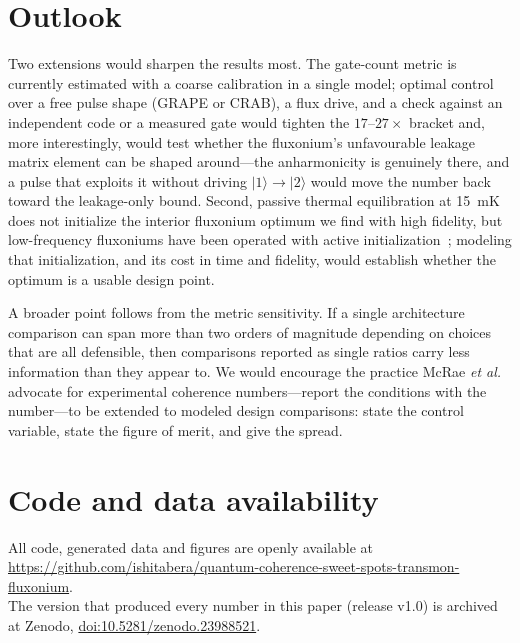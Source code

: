 \documentclass{SciPost}
\begin{document}
\section{Outlook}

Two extensions would sharpen the results most. The gate-count metric is currently estimated with a
coarse calibration in a single model; optimal control over a free pulse shape (GRAPE or CRAB),
a flux drive, and a check against an independent code or a measured gate would tighten the $17$--$27\times$ bracket and, more interestingly, would test whether the fluxonium's
unfavourable leakage matrix element can be shaped around---the anharmonicity is genuinely
there, and a pulse that exploits it without driving $|1\rangle \to |2\rangle$ would move the
number back toward the leakage-only bound. Second, passive thermal equilibration at \SI{15}{\milli\kelvin} does not initialize the interior fluxonium
optimum we find with high fidelity, but low-frequency fluxoniums have been operated
with active initialization~\cite{zhang2021,najerasantos2024}; modeling that initialization, and
its cost in time and fidelity, would establish whether the optimum is a usable design point.

A broader point follows from the metric sensitivity. If a single architecture comparison can
span more than two orders of magnitude depending on choices that are all defensible, then comparisons
reported as single ratios carry less information than they appear to. We would encourage the
practice McRae \emph{et al.}~\cite{mcrae2021} advocate for experimental coherence
numbers---report the conditions with the number---to be extended to modeled design
comparisons: state the control variable, state the figure of merit, and give the spread.

\section*{Code and data availability}

All code, generated data and figures are openly available at\\
\url{https://github.com/ishitabera/quantum-coherence-sweet-spots-transmon-fluxonium}.\\
The version that produced every number in this paper (release v1.0) is archived at Zenodo,
\href{https://doi.org/10.5281/zenodo.23988521}{doi:10.5281/zenodo.23988521}.
\end{document}
